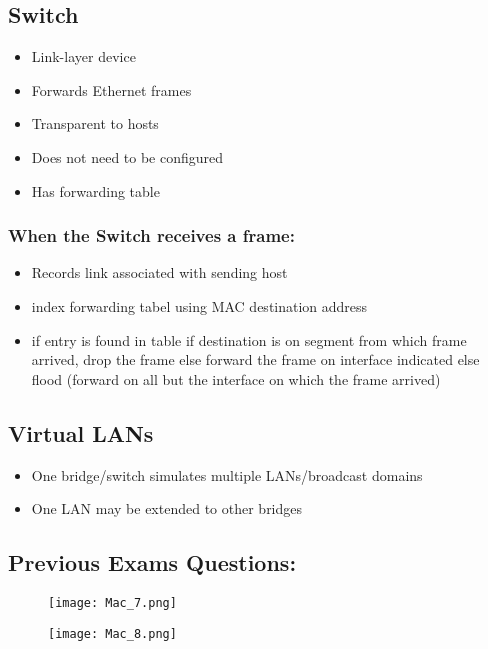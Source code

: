 \documentclass[../resumosRCOM.tex]{subfiles}
\begin{document}
\subsection{Switch}
\begin{itemize}
    \item Link-layer device
    \item Forwards Ethernet frames
    \item Transparent to hosts
    \item Does not need to be configured
    \item Has forwarding table
\end{itemize}
\subsubsection{When the Switch receives a frame:}
\begin{itemize}
    \item Records link associated with sending host
    \item index forwarding tabel using MAC destination address
    \item if entry is found in table
    \subitem if destination is on segment from which frame arrived,
    \subsubitem drop the frame
    \subitem else
    \subsubitem forward the frame on interface indicated
    else flood (forward on all but the interface on which the frame arrived)
\end{itemize}
\subsection{Virtual LANs}
\begin{itemize}
    \item One bridge/switch simulates multiple LANs/broadcast domains
    \item One LAN may be extended to other bridges
\end{itemize}

\subsection{Previous Exams Questions:}
\begin{figure}[H]
    \centering
    \texttt{[image: Mac\_7.png]}
\end{figure}

\begin{figure}[H]
    \centering
    \texttt{[image: Mac\_8.png]}
\end{figure}
\end{document}
